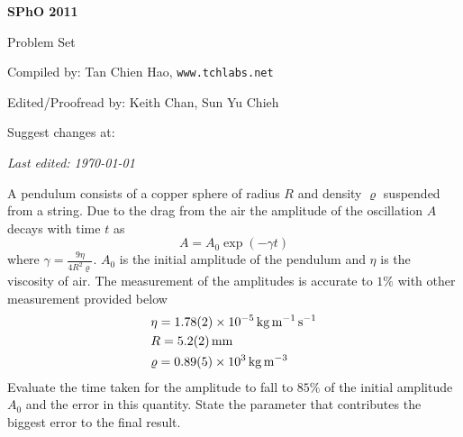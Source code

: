 \def\sphoyear{2011}
\setcounter{section}{0}
\fancyhead[L]{\textbf{SPhO \sphoyear}} 


\begin{titlepage}
\centering

{\Huge\bfseries SPhO \sphoyear}

\vspace{1cm}

{\LARGE Problem Set}

\vspace{2cm}

{\Large Compiled by: Tan Chien Hao, \texttt{www.tchlabs.net}}

\vspace{2cm}

{\Large Edited/Proofread by: Keith Chan, Sun Yu Chieh}

\vspace{2cm}

{\large Suggest changes at: \github}


\vfill

{\itshape Last edited: \today}
\end{titlepage}

\begin{problem}
    A pendulum consists of a copper sphere of radius $R$ and density $\varrho$ suspended from a string. Due to the drag from the air the amplitude of the oscillation $A$ decays with time $t$ as
    \[A=A_0 \exp(-\gamma t)\]
    where $\gamma=\frac{9 \eta}{4 R^{2} \varrho}$. $A_0$ is the initial amplitude of the pendulum and $\eta$ is the viscosity of air. The measurement of the amplitudes is accurate to $1\%$ with other measurement provided below
    \begin{align*}
        &\eta=\qty{1.78\pm 0.02e-5}{\kg\per\m\per\s}\\
	    &R=\qty{5.2\pm 0.2}{\mm} \\
	    &\varrho=\qty{0.89\pm 0.05e3}{\kg\per\m\cubed}
    \end{align*}
    Evaluate the time taken for the amplitude to fall to $85\%$ of the initial amplitude $A_{0}$ and the error in this quantity. State the parameter that contributes the biggest error to the final result.
\end{problem}

